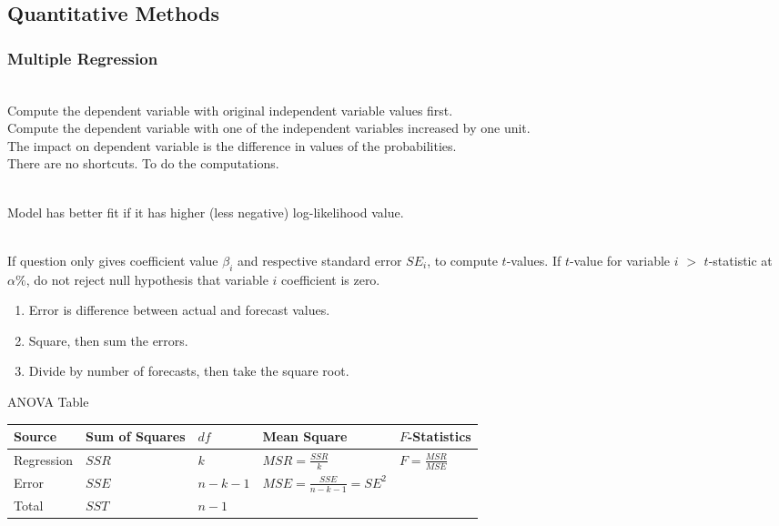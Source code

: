 \subsection{Quantitative Methods}

\subsubsection{Multiple Regression}

\begin{method} \\
Compute the dependent variable with original independent variable values first.\\
Compute the dependent variable with one of the independent variables increased by one unit.\\
The impact on dependent variable is the difference in values of the probabilities.\\
There are no shortcuts. To do the computations.
\end{method}

\begin{method} \\
Model has better fit if it has higher (less negative) log-likelihood value.
\end{method}

\begin{method} \\
If question only gives coefficient value $\beta_i$ and respective standard error $SE_i$, to compute $t$-values. If $t$-value for variable $i$ $>$ $t$-statistic at $\alpha \%$, do not reject null hypothesis that variable $i$ coefficient is zero.
\end{method}

\begin{method} 
\begin{enumerate}[label=\roman*.]
\setlength{\itemsep}{0pt}
\item Error is difference between actual and forecast values.
\item Square, then sum the errors.
\item Divide by number of forecasts, then take the square root.
\end{enumerate}
\end{method}

ANOVA Table\\
\begin{tabularx}{\textwidth}{X|X|X|p{12em}|X}
\hline
\rowcolor{gray!30}
Source & Sum of Squares & $df$ & Mean Square & $F$-Statistics \\
\hline
Regression & $SSR$ & $k$ & $MSR = \frac{SSR}{k}$ & $F = \frac{MSR}{MSE}$ \\
Error & $SSE$ & $n-k-1$ & $MSE = \frac{SSE}{n-k-1} = SE^2$ & \\
Total & $SST$ & $n-1$ & &\\
\hline
\end{tabularx}

